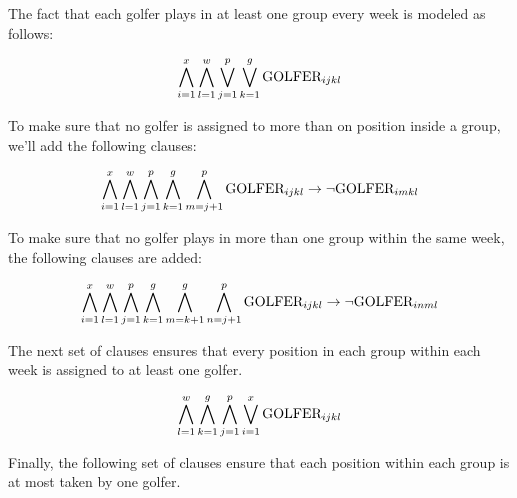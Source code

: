 \documentclass[a4paper]{scrartcl}
\begin{document}
The fact that each golfer plays in at least one group every week is modeled as follows:

\begin{equation}
\label{form:everyone_plays}
\centering
    \bigwedge \limits_{i=1}^x 
    \bigwedge \limits_{l=1}^w 
    \bigvee \limits_{j=1}^p
    \bigvee \limits_{k=1}^g 
    \text{GOLFER}_{ijkl}
\end{equation}

To make sure that no golfer is assigned to more than on position inside a group, we'll add the following clauses:

\begin{equation}
\centering
    \bigwedge \limits_{i=1}^x 
    \bigwedge \limits_{l=1}^w 
    \bigwedge \limits_{j=1}^p
    \bigwedge \limits_{k=1}^g 
    \bigwedge \limits_{m=j+1}^p 
    \text{GOLFER}_{ijkl} 
    \to
    \neg \text{GOLFER}_{imkl}
\end{equation}

To make sure that no golfer plays in more than one group within the same week, the following clauses are added:

\begin{equation}
\centering
    \bigwedge \limits_{i=1}^x 
    \bigwedge \limits_{l=1}^w 
    \bigwedge \limits_{j=1}^p
    \bigwedge \limits_{k=1}^g 
    \bigwedge \limits_{m=k+1}^g 
    \bigwedge \limits_{n=j+1}^p 
    \text{GOLFER}_{ijkl} 
    \to
    \neg \text{GOLFER}_{inml}
\end{equation}

The next set of clauses ensures that every position in each group within each week is assigned to at least one golfer.

\begin{equation}
\centering
    \bigwedge \limits_{l=1}^w 
    \bigwedge \limits_{k=1}^g 
    \bigwedge \limits_{j=1}^p
    \bigvee \limits_{i=1}^x 
    \text{GOLFER}_{ijkl}
\end{equation}


Finally, the following set of clauses ensure that each position within each group is at most taken by one golfer.
\end{document}
